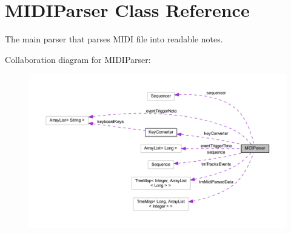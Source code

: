\hypertarget{classcom_1_1lclion_1_1midiparser_1_1_m_i_d_i_parser}{\section{M\+I\+D\+I\+Parser Class Reference}
\label{classcom_1_1lclion_1_1midiparser_1_1_m_i_d_i_parser}
}


The main parser that parses M\+I\+D\+I file into readable notes.  




Collaboration diagram for M\+I\+D\+I\+Parser\+:\nopagebreak
\begin{figure}[H]
\begin{center}
\leavevmode
\includegraphics[width=350pt]{classcom_1_1lclion_1_1midiparser_1_1_m_i_d_i_parser__coll__graph}
\end{center}
\end{figure}
